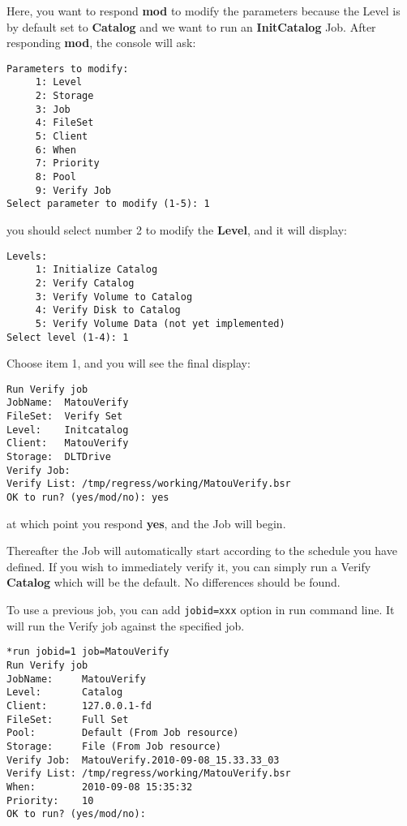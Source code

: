 Here, you want to respond {\bf mod} to modify the parameters because the Level
is by default set to {\bf Catalog} and we want to run an {\bf InitCatalog}
Job. After responding {\bf mod}, the console will ask:

\footnotesize
\begin{verbatim}
Parameters to modify:
     1: Level
     2: Storage
     3: Job
     4: FileSet
     5: Client
     6: When
     7: Priority
     8: Pool
     9: Verify Job
Select parameter to modify (1-5): 1
\end{verbatim}
\normalsize

you should select number 2 to modify the {\bf Level}, and it will display:

\footnotesize
\begin{verbatim}
Levels:
     1: Initialize Catalog
     2: Verify Catalog
     3: Verify Volume to Catalog
     4: Verify Disk to Catalog
     5: Verify Volume Data (not yet implemented)
Select level (1-4): 1
\end{verbatim}
\normalsize

Choose item 1, and you will see the final display:

\footnotesize
\begin{verbatim}
Run Verify job
JobName:  MatouVerify
FileSet:  Verify Set
Level:    Initcatalog
Client:   MatouVerify
Storage:  DLTDrive
Verify Job:
Verify List: /tmp/regress/working/MatouVerify.bsr
OK to run? (yes/mod/no): yes
\end{verbatim}
\normalsize

at which point you respond {\bf yes}, and the Job will begin.

Thereafter the Job will automatically start according to the schedule you
have defined. If you wish to immediately verify it, you can simply run a
Verify {\bf Catalog} which will be the default. No differences should be
found.

To use a previous job, you can add \texttt{jobid=xxx} option in run command
line. It will run the Verify job against the specified job.

\begin{verbatim}
*run jobid=1 job=MatouVerify
Run Verify job
JobName:     MatouVerify
Level:       Catalog
Client:      127.0.0.1-fd
FileSet:     Full Set
Pool:        Default (From Job resource)
Storage:     File (From Job resource)
Verify Job:  MatouVerify.2010-09-08_15.33.33_03
Verify List: /tmp/regress/working/MatouVerify.bsr
When:        2010-09-08 15:35:32
Priority:    10
OK to run? (yes/mod/no):
\end{verbatim}

